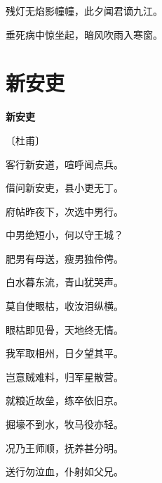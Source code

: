 \documentclass[12pt,UTF-8,openany,fontset=none]{ctexbook}
\begin{document}
    \vspace{18pt}  %

\begin{center}
    \begin{Large}

        残灯无焰影幢幢，此夕闻君谪九江。

        垂死病中惊坐起，暗风吹雨入寒窗。

    \end{Large}

\end{center}

\vspace{8pt}
\clearpage

\section{新安吏}


\begin{center}
    {\bfseries 新安吏}

    \vspace{18pt}

    \begin{large}\xuwen
        〔杜甫〕
    \end{large}

\end{center}

    \vspace{18pt}  %

\begin{center}
    \begin{Large}

        客行新安道，喧呼闻点兵。

        借问新安吏，县小更无丁。

        府帖昨夜下，次选中男行。

        中男绝短小，何以守王城？

        肥男有母送，瘦男独伶俜。

        白水暮东流，青山犹哭声。

        莫自使眼枯，收汝泪纵横。

        眼枯即见骨，天地终无情。

        我军取相州，日夕望其平。

        岂意贼难料，归军星散营。

        就粮近故垒，练卒依旧京。

        掘壕不到水，牧马役亦轻。

        况乃王师顺，抚养甚分明。

        送行勿泣血，仆射如父兄。

    \end{Large}

\end{center}
\end{document}
